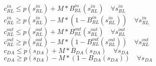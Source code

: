 $c^{in}_{RL} \leq p(s^{in}_{RL}) + M * B^{in}_{RL}(s^{in}_{RL})\quad\forall s^{in}_{RL} $ \\
$c^{in}_{RL} \geq p(s^{in}_{RL}) - M * (1 - B^{in}_{RL}(s^{in}_{RL}))\quad\forall s^{in}_{RL} $ \\

$c^{out}_{RL} \leq p(s^{out}_{RL}) + M * B^{out}_{RL}(s^{out}_{RL})\quad\forall s^{out}_{RL} $ \\
$c^{out}_{RL} \geq p(s^{out}_{RL}) - M * (1 - B^{out}_{RL}(s^{out}_{RL}))\quad\forall s^{out}_{RL} $ \\

$c_{DA} \leq p(s_{DA}) + M * B_{DA}(s_{DA})\quad\forall s_{DA} $ \\
$c_{DA} \geq p(s_{DA}) - M * (1 - B_{DA}(s_{DA}))\quad\forall s_{DA} $ \\